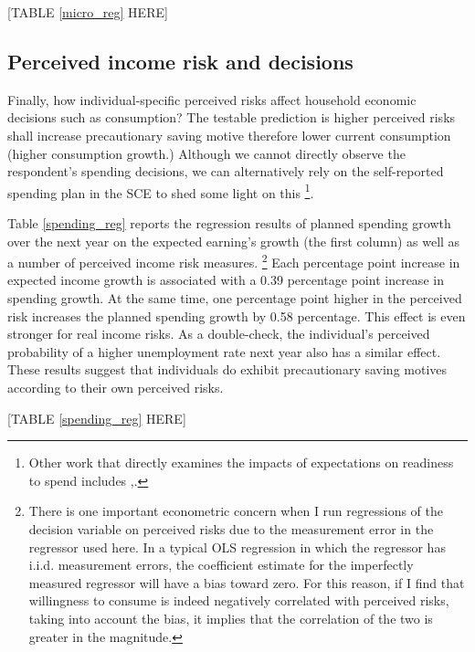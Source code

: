 \documentclass[12pt,notitlepage,onecolumn,aps,pra]{article}
\begin{document}
\begin{center}
 [TABLE \ref{micro_reg} HERE]
 \end{center}



    \hypertarget{perceived-income-risk-and-decisions}{%
\subsection{Perceived income risk and
decisions}\label{perceived-income-risk-and-decisions}}

Finally, how individual-specific perceived risks affect household
economic decisions such as consumption? The testable prediction is
higher perceived risks shall increase precautionary saving motive
therefore lower current consumption (higher consumption growth.)
Although we cannot directly observe the respondent's spending decisions,
we can alternatively rely on the self-reported spending plan in the SCE
to shed some light on this
\footnote{Other work that directly examines the impacts of expectations on readiness to spend includes \cite{bachmann2015inflation},\cite{coibion2020forward}.}.

Table \ref{spending_reg} reports the regression results of planned
spending growth over the next year on the expected earning's growth (the
first column) as well as a number of perceived income risk measures.
\footnote{There is one important econometric concern when I run regressions of the decision variable on perceived risks due to the measurement error in the regressor used here. In a typical OLS regression in which the regressor has i.i.d. measurement errors, the coefficient estimate for the imperfectly measured regressor will have a bias toward zero. For this reason, if I find that willingness to consume is indeed negatively correlated with perceived risks, taking into account the bias, it implies that the correlation of the two is greater in the magnitude.}
Each percentage point increase in expected income growth is associated
with a 0.39 percentage point increase in spending growth. At the same
time, one percentage point higher in the perceived risk increases the
planned spending growth by 0.58 percentage. This effect is even stronger
for real income risks. As a double-check, the individual's perceived
probability of a higher unemployment rate next year also has a similar
effect. These results suggest that individuals do exhibit precautionary
saving motives according to their own perceived risks.

\begin{center}
[TABLE \ref{spending_reg} HERE]
\end{center}
\end{document}

